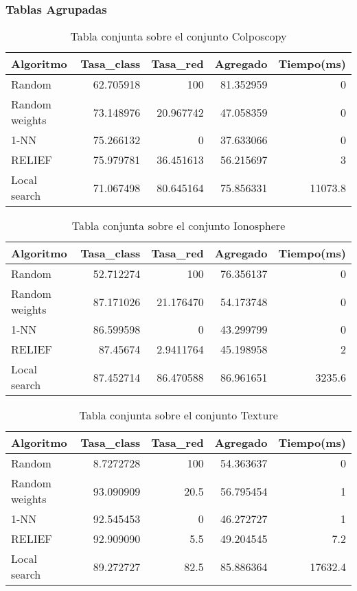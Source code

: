 \documentclass[size=a4, parskip=half, titlepage=false, toc=flat, toc=bib, 12pt]{scrartcl}
\begin{document}
\newpage

\subsubsection{Tablas Agrupadas}

 \begin{table}[ht]
  \centering
  \begin{tabular}[t]{lrrrr}
  \toprule
  Algoritmo &Tasa\_class &Tasa\_red & Agregado & Tiempo(ms)\\
  \midrule
 Random             & 62.705918 & 100 & 81.352959 & 0\\
 Random weights     & 73.148976 & 20.967742 & 47.058359 & 0\\
 1-NN               & 75.266132 & 0 & 37.633066 & 0\\
 RELIEF             & 75.979781 & 36.451613 & 56.215697 & 3\\
 Local search       & 71.067498 & 80.645164 & 75.856331 & 11073.8\\
  \bottomrule
  \end{tabular}
  \caption{Tabla conjunta sobre el conjunto Colposcopy }
  \end{table}%

 \begin{table}[ht]
  \centering
  \begin{tabular}[t]{lrrrr}
  \toprule
  Algoritmo &Tasa\_class &Tasa\_red & Agregado & Tiempo(ms)\\
  \midrule
 Random & 52.712274 & 100 & 76.356137 & 0\\
 Random weights & 87.171026 & 21.176470 & 54.173748 & 0\\
1-NN & 86.599598 & 0 & 43.299799 & 0\\
 RELIEF& 87.45674 & 2.9411764 & 45.198958 & 2\\
 Local search& 87.452714 & 86.470588 & 86.961651 & 3235.6\\
  \bottomrule
  \end{tabular}
  \caption{Tabla conjunta sobre el conjunto Ionosphere}
  \end{table}%

 \begin{table}[ht]
  \centering
  \begin{tabular}[t]{lrrrr}
  \toprule
  Algoritmo &Tasa\_class &Tasa\_red & Agregado & Tiempo(ms)\\
  \midrule
 Random             & 8.7272728 & 100 & 54.363637 & 0\\
 Random weights     & 93.090909 & 20.5 & 56.795454 & 1\\
 1-NN               & 92.545453 & 0 & 46.272727 & 1\\
 RELIEF             & 92.909090 & 5.5 & 49.204545 & 7.2\\
 Local search       & 89.272727 & 82.5 & 85.886364 & 17632.4\\
\bottomrule
  \end{tabular}
  \caption{Tabla conjunta sobre el conjunto Texture}
  \end{table}%
\end{document}
